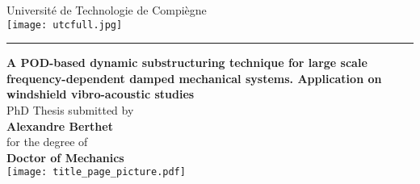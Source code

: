 \begin{titlepage}
    \begin{center}
        
        \Large
        Université de Technologie de Compiègne\\[.4cm]
        \texttt{[image: utcfull.jpg]}
        \vspace{.5cm}
        \hrule
        \vspace{1.2cm}
        
        \textbf{A POD-based dynamic substructuring technique for large scale frequency-dependent damped mechanical systems. Application on windshield vibro-acoustic studies}\\[1.2cm]
        
        \normalsize
        PhD Thesis submitted by\\
        \large
        \textbf{Alexandre Berthet}\\[.8cm]
        
        \normalsize
        for the degree of\\
        \large
        \textbf{Doctor of Mechanics}\\[0.8cm]
        
        \vfill
        \texttt{[image: title\_page\_picture.pdf]}
        \vfill
        
		\begin{figure}[b]
    		\centering
    		\def\h{1.2cm} %
		\end{figure}
        
    \end{center}
\end{titlepage}